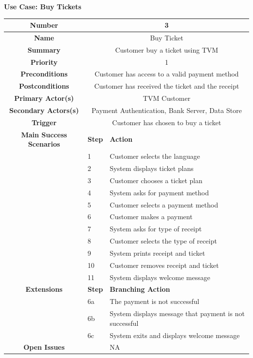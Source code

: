\documentclass[a4paper,12pt]{report}
\begin{document}
\vspace{0.5cm}
\textbf{\large Use Case: Buy Tickets}
\\

\begin{tabular}{ | c | p{2cm} | p{7cm} |}
	
	\hline
	\textbf{Number} & \multicolumn{2}{c|}{3}  \\
	\hline
	\textbf{Name} & \multicolumn{2}{c|}{Buy Ticket}  \\
	\hline
	\textbf{Summary} & \multicolumn{2}{c|}{Customer buy a ticket using TVM}  \\
	\hline
	\textbf{Priority} & \multicolumn{2}{c|}{1}  \\
	\hline
	\textbf{Preconditions} & \multicolumn{2}{c|}{Customer has access to a valid payment method}  \\
	\hline
	\textbf{Postconditions} & \multicolumn{2}{c|}{Customer has received the ticket and the receipt}  \\
	\hline
	\textbf{Primary Actor(s)} & \multicolumn{2}{c|}{TVM Customer}  \\
	\hline
	\textbf{Secondary Actors(s)} & \multicolumn{2}{c|}{Payment Authentication, Bank Server, Data Store}  \\
	\hline
	\textbf{Trigger} & \multicolumn{2}{c|}{Customer has chosen to buy a ticket}  \\
	\hline
	\textbf{Main Success Scenarios} & \textbf{Step} & \textbf{Action} \\
	\hline
	& 1 & Customer selects the language \\ 
	\hline
	&  2  & System displays ticket plans \\
	\hline
	&  3  & Customer chooses a ticket plan \\
	\hline
	&  4  & System asks for payment method \\
	\hline
	&  5  & Customer selects a payment method \\
	\hline
	&  6  & Customer makes a payment \\
	\hline
	&  7  & System asks for type of receipt \\
	\hline
	&  8  & Customer selects the type of receipt \\
	\hline
	&  9  & System prints receipt and ticket \\
	\hline
	&  10  & Customer removes receipt and ticket \\
	\hline
	&  11  & System displays welcome message \\
	\hline
	\textbf{Extensions} & \textbf{Step} & \textbf{Branching Action} \\
	\hline
	&  6a  & The payment is not successful \\
	\hline
	&  6b  & System displays message that payment is not successful \\
	\hline
	&  6c  & System exits and displays welcome message \\
	\hline
	\textbf{Open Issues} &    & NA \\
	\hline
	
\end{tabular}
\end{document}

